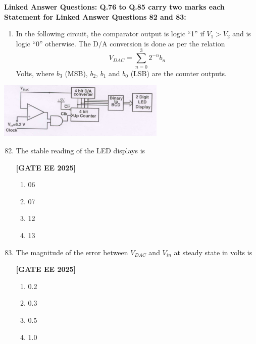 \documentclass[12pt]{article}
\begin{document}
\vspace{1em}
 \large \textbf {Linked Answer Questions: Q.76 to Q.85 carry two marks each}
 \large \textbf {Statement for Linked Answer Questions 82 and 83: }
\vspace{1em}
\begin{enumerate}
\item In the following circuit, the comparator output is logic “1” if $V_1 > V_2$ and is logic “0” otherwise. The D/A conversion is done as per the relation
\[
V_{DAC} = \sum_{n=0}^3 2^{-n} b_n
\]
Volts, where $b_3$ (MSB), $b_2$, $b_1$ and $b_0$ (LSB) are the counter outputs.
\end{enumerate}
\begin{center}
\includegraphics[width=0.6\textwidth]{figs/q8283.png}
\end{center}

\begin{enumerate}[leftmargin=*, label=\textbf{Q.\arabic*:}]
\setcounter{enumi}{81}

\item The stable reading of the LED displays is
 
\noindent \textbf{[GATE EE 2025]}
\begin{enumerate}[label=(\Alph*)]
  \item 06
  \item 07
  \item 12
  \item 13
\end{enumerate}

\item The magnitude of the error between $V_{DAC}$ and $V_{in}$ at steady state in volts is
 
\noindent \textbf{[GATE EE 2025]}
\begin{enumerate}[label=(\Alph*)]
  \item 0.2
  \item 0.3
  \item 0.5
  \item 1.0
\end{enumerate}

\end{enumerate}
\end{document}
